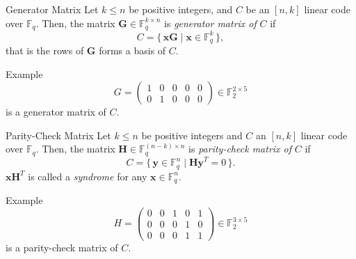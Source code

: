 \begin{frame}[allowframebreaks]
\framebreak

    \begin{block}{Generator Matrix}
        Let $k \leq n$ be positive integers, and $C$ be an $[n, k]$ linear code over $\mathbb{F}_q$. Then, the matrix $\mathbf{G} \in \mathbb{F}_q^{k \times n}$ is \textit{generator matrix of} $C$ if 
        \[
        C = 
        \{\, \mathbf{xG} \mid \mathbf{x} \in \mathbb{F}_q^k\,\},
        \]
        that is the rows of $\mathbf{G}$ forms a basis of $C$.
    \end{block}

    \begin{exampleblock}{Example}
    \[
    G = \begin{pmatrix}
        1 & 0 & 0 & 0 & 0\\
        0 & 1 & 0 & 0 & 0 
    \end{pmatrix} \in \mathbb{F}_2^{2 \times 5}
    \] is a generator matrix of $C$.
    \end{exampleblock}

\framebreak

    \begin{block}{Parity-Check Matrix}
        Let $k \leq n$ be positive integers and $C$ an $[n, k]$ linear code over $\mathbb{F}_q$. Then, the matrix $\mathbf{H} \in \mathbb{F}_q^{(n-k) \times n}$ is \textit{parity-check matrix of} $C$ if 
        \[
        C = 
        \{\, \mathbf{y} \in \mathbb{F}_q^n \mid \mathbf{Hy}^T = 0\,\}.
        \]
        $\mathbf{xH}^T$ is called a \textit{syndrome} for any $\mathbf{x} \in \mathbb{F}_q^n$.
    \end{block}

    \begin{exampleblock}{Example}
    \[
    H = \begin{pmatrix}
        0 & 0 & 1 & 0 & 1\\
        0 & 0 & 0 & 1 & 0 \\
        0 & 0 & 0 & 1 & 1
    \end{pmatrix} \in \mathbb{F}_2^{3 \times 5}
    \] is a parity-check matrix of $C$.
    \end{exampleblock}
    
\end{frame}

